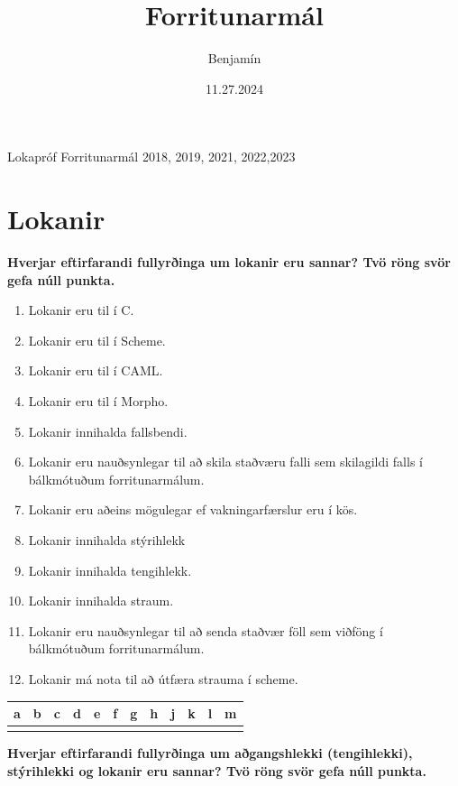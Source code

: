 \documentclass{article}
\title{Forritunarmál}
\author{Benjamín}
\date{11.27.2024}
\newcommand{\bo}[1]{\textbf{#1}}
\newcommand{\enum}{\begin{enumerate}[label = \alph*.]}
\begin{document}
\maketitle

\begin{center}
    \Huge{Lokapróf Forritunarmál 2018, 2019, 2021, 2022,2023}
\end{center}

\newpage

\section{Lokanir}

\bo{Hverjar eftirfarandi fullyrðinga um lokanir eru sannar? Tvö röng
svör gefa núll punkta.}


\enum
\item Lokanir eru til í C.
\item Lokanir eru til í Scheme.
\item Lokanir eru til í CAML.
\item Lokanir eru til í Morpho.
\item Lokanir innihalda fallsbendi.
\item Lokanir eru nauðsynlegar til að skila staðværu falli sem skilagildi
      falls í bálkmótuðum forritunarmálum.
\item Lokanir eru aðeins mögulegar ef vakningarfærslur eru í kös.
\item Lokanir innihalda stýrihlekk
\item Lokanir innihalda tengihlekk.
\item Lokanir innihalda straum.
\item Lokanir eru nauðsynlegar til að senda staðvær föll sem viðföng í bálkmótuðum forritunarmálum.
\item Lokanir má nota til að útfæra strauma í scheme.

\end{enumerate}

\begin{tabularx}{\textwidth}{|X|X|X|X|X|X|X|X|X|X|X|X|}
    \hline
    \bo{a} & \bo{b} & \bo{c} & \bo{d} & \bo{e} & \bo{f} & \bo{g} & \bo{h} & \bo{j} & \bo{k} & \bo{l} & \bo{m} \\ \hline
     & & & & & & & & & & & \\ \hline
\end{tabularx}

\newpage

\bo{Hverjar eftirfarandi fullyrðinga um aðgangshlekki (tengihlekki),
stýrihlekki og lokanir eru sannar? Tvö röng svör gefa núll punkta.}
\end{document}
